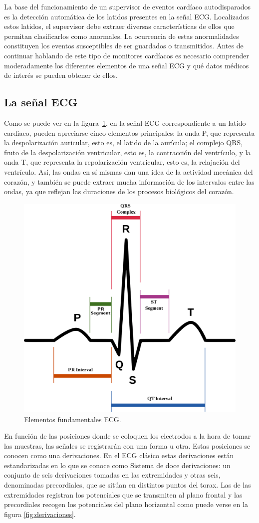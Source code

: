 La base del funcionamiento de un supervisor de eventos cardíaco autodisparados es la detección automática de los latidos presentes en la señal ECG.\cite{Satija} Localizados estos latidos, el supervisor debe extraer diversas características de ellos que permitan clasificarlos como anormales. La ocurrencia de estas anormalidades constituyen los eventos susceptibles de ser guardados o transmitidos.  Antes de continuar hablando de este tipo de monitores cardíacos es necesario comprender moderadamente los diferentes elementos de una señal ECG y qué datos médicos de interés se pueden obtener de ellos. 

\subsection{La señal ECG}

Como se puede ver en la figura~\ref{fig:ECGelements}, en la señal ECG correspondiente a un latido cardiaco, pueden apreciarse cinco elementos principales: la onda P, que representa la despolarización auricular, esto es, el latido de la aurícula; el complejo QRS, fruto de la despolarización ventricular, esto es, la contracción del ventrículo, y la onda T, que representa la repolarización ventricular, esto es, la relajación del ventrículo. Así, las ondas en sí mismas dan una idea de la actividad mecánica del corazón, y también se puede extraer mucha información de los intervalos entre las ondas, ya que reflejan las duraciones de los procesos biológicos del corazón.

\begin{figure}[ht]  
    \centering
        \includegraphics[width =0.4\linewidth]{figuras/ECGelementsDetailed.png}
    \caption{Elementos fundamentales ECG.}
    \label{fig:ECGelements}
\end{figure}

En función de las posiciones donde se coloquen los electrodos a la hora de tomar las muestras, las señales se registrarán con una forma u otra. Estas posiciones se conocen como una derivaciones. En el ECG clásico estas derivaciones están estandarizadas en lo que se conoce como Sistema de doce derivaciones: un conjunto de seis derivaciones tomadas en las extremidades y otras seis, denominadas precordiales, que se sitúan en distintos puntos del torax. Las de las extremidades registran los potenciales que se transmiten al plano frontal y las precordiales recogen los potenciales del plano horizontal como puede verse en la figura \ref{fig:derivaciones}. \cite{Harrison}

